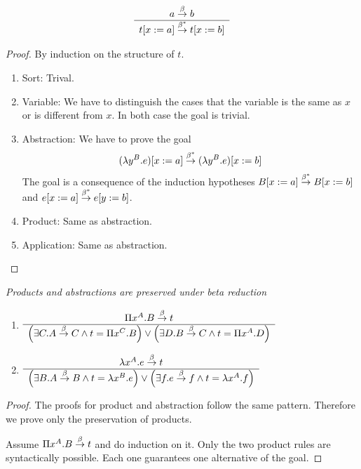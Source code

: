 \begin{theorem}
    \label{ReducedSubstitutionTerm}
    $$
    \begin{array}{c} 
        a \stackrel{\beta}{\to} b
     \\ \hline 
        t[x:=a] \stackrel{\beta^*}{\to} t[x:=b]
    \end{array}
    $$
    \begin{proof}
        By induction on the structure of $t$.

        \begin{enumerate}
        \item Sort: Trival.

        \item Variable: We have to distinguish the cases that the variable is
            the same as $x$ or is different from $x$. In both case the goal is
                trivial.

        \item Abstraction:
            We have to prove the goal
            $$
                (\lambda y^B.e)[x:=a] \stackrel{\beta^*}{\to} (\lambda y^B.e)[x:=b]
            $$
            The goal is a consequence of the induction hypotheses $B[x:=a]
                \stackrel{\beta^*}{\to} B[x:=b]$ and $e[x:=a] \stackrel{\beta^*}{\to} e[y:=b]$.

        \item Product: Same as abstraction.

        \item Application: Same as abstraction.
        \end{enumerate}
    \end{proof}
\end{theorem}



\begin{lemma}
    \label{ReductionProductAbstraction}
    \emph{Products and abstractions are preserved under beta reduction}
    \begin{enumerate}
    \item
    $
        \begin{array}{c} 
            \Pi x^A.B \stackrel{\beta}{\to} t
         \\ \hline 
            \left( \exists C. A \stackrel{\beta}{\to} C \land t = \Pi x^C. B \right)
            \lor
            \left( \exists D. B \stackrel{\beta}{\to} C \land t = \Pi x^A. D \right)
        \end{array}
    $
    \item
    $
        \begin{array}{c} 
            \lambda x^A.e \stackrel{\beta}{\to} t
         \\ \hline 
            \left( \exists B. A \stackrel{\beta}{\to} B \land t = \lambda x^B. e \right)
            \lor
            \left( \exists f. e \stackrel{\beta}{\to} f \land t = \lambda x^A. f \right)
        \end{array}
    $
    \end{enumerate}

    \begin{proof}
        The proofs for product and abstraction follow the same pattern.
        Therefore we prove only the preservation of products.

        Assume $\Pi x^A. B \stackrel{\beta}{\to} t$ and do induction on it. Only the two
        product rules are syntactically possible. Each one guarantees one
        alternative of the goal.
    \end{proof}
\end{lemma}



